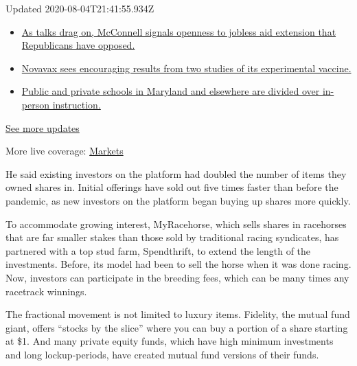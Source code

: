 Updated 2020-08-04T21:41:55.934Z

\begin{itemize}
\tightlist
\item
  \href{https://www.nytimes3xbfgragh.onion/2020/08/04/world/coronavirus-cases.html?action=click\&pgtype=Article\&state=default\&region=MAIN_CONTENT_1\&context=storylines_live_updates\#link-2daa96b5}{As
  talks drag on, McConnell signals openness to jobless aid extension
  that Republicans have opposed.}
\item
  \href{https://www.nytimes3xbfgragh.onion/2020/08/04/world/coronavirus-cases.html?action=click\&pgtype=Article\&state=default\&region=MAIN_CONTENT_1\&context=storylines_live_updates\#link-1228a480}{Novavax
  sees encouraging results from two studies of its experimental
  vaccine.}
\item
  \href{https://www.nytimes3xbfgragh.onion/2020/08/04/world/coronavirus-cases.html?action=click\&pgtype=Article\&state=default\&region=MAIN_CONTENT_1\&context=storylines_live_updates\#link-4825b93}{Public
  and private schools in Maryland and elsewhere are divided over
  in-person instruction.}
\end{itemize}

\href{https://www.nytimes3xbfgragh.onion/2020/08/04/world/coronavirus-cases.html?action=click\&pgtype=Article\&state=default\&region=MAIN_CONTENT_1\&context=storylines_live_updates}{See
more updates}

More live coverage:
\href{https://www.nytimes3xbfgragh.onion/live/2020/08/04/business/stock-market-today-coronavirus?action=click\&pgtype=Article\&state=default\&region=MAIN_CONTENT_1\&context=storylines_live_updates}{Markets}

He said existing investors on the platform had doubled the number of
items they owned shares in. Initial offerings have sold out five times
faster than before the pandemic, as new investors on the platform began
buying up shares more quickly.

To accommodate growing interest, MyRacehorse, which sells shares in
racehorses that are far smaller stakes than those sold by traditional
racing syndicates, has partnered with a top stud farm, Spendthrift, to
extend the length of the investments. Before, its model had been to sell
the horse when it was done racing. Now, investors can participate in the
breeding fees, which can be many times any racetrack winnings.

The fractional movement is not limited to luxury items. Fidelity, the
mutual fund giant, offers ``stocks by the slice'' where you can buy a
portion of a share starting at \$1. And many private equity funds, which
have high minimum investments and long lockup-periods, have created
mutual fund versions of their funds.

